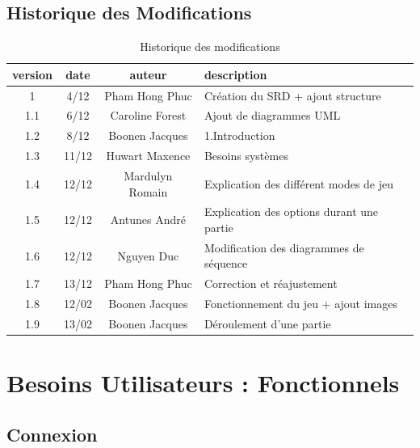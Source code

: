 \documentclass[10pt, a4paper]{article}
\begin{document}
\begin{description}
		\end{description}
		\clearpage

		\subsection{Historique des Modifications}

		\begin{table}[h!]

			\centering

			\begin{tabular}{|c|c|c|p{50mm}|}
				\hline
				 \textbf{version} & \textbf{date} & \textbf{auteur}  & \textbf{description} \\ \hline
				 1 & 4/12 & Pham Hong Phuc & Création du SRD + ajout structure\\ \hline
				 1.1 & 6/12 & Caroline Forest & Ajout de diagrammes UML\\ \hline
				 1.2 & 8/12 & Boonen Jacques & 1.Introduction\\ \hline
				 1.3 & 11/12 & Huwart Maxence & Besoins systèmes\\ \hline
				 1.4 & 12/12 & Mardulyn Romain & Explication des différent modes de jeu\\ \hline
				 1.5 & 12/12 & Antunes André & Explication des options durant une partie\\ \hline
         1.6 & 12/12 & Nguyen Duc & Modification des diagrammes de séquence\\ \hline
         1.7 & 13/12 & Pham Hong Phuc & Correction et réajustement \\ \hline
				 1.8 & 12/02 & Boonen Jacques & Fonctionnement du jeu + ajout images \\ 
				 1.9 & 13/02 & Boonen Jacques & Déroulement d'une partie \\ 
				\hline
\end{tabular}
			\caption*{Historique des modifications}
			\end{table}
\clearpage


\section{Besoins Utilisateurs : Fonctionnels}


\subsection{Connexion}
\end{document}
